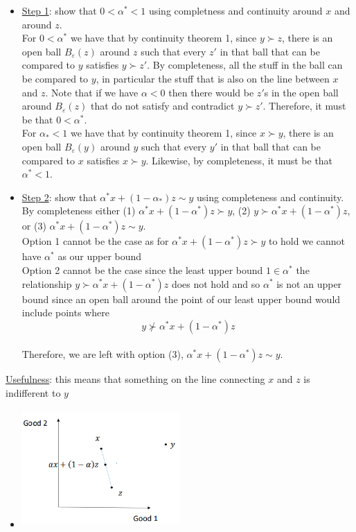 \documentclass{article}
\begin{document}
  \begin{itemize}
    \item  \underline{Step 1}: show that $0 < \alpha^{*} < 1$ using completness and continuity around $x$ and around $z$. \\ For $0 < \alpha^{*}$ we have that by continuity theorem 1, since $y \succ z$, there is an open ball $B_{\varepsilon}(z)$ around $z$ such that every $z'$ in that ball that can be compared to $y$ satisfies $y \succ z'$. By completeness, all the stuff in the ball can be compared to $y$, in particular the stuff that is also on the line between $x$ and $z$. Note that if we have $\alpha < 0$ then there would be $z'$s in the open ball around $B_{\varepsilon}(z)$ that do not satisfy and contradict $y \succ z'$. Therefore, it must be that $0 < \alpha^{*}$. \\ For $\alpha_{*} < 1$ we have that by continuity theorem 1, since $x \succ y$, there is an open ball $B_{\varepsilon}(y)$ around $y$ such that every $y'$ in that ball that can be compared to $x$ satisfies $x \succ y$. Likewise, by completeness, it must be that $\alpha^{*} < 1$.
    \item  \underline{Step 2}: show that $\alpha^{*}x + (1 - \alpha_{*})z \sim y$ using completeness and continuity. By completeness either (1) $\alpha^{*}x + (1-\alpha^{*})z \succ y$, (2) $y \succ \alpha^{*}x + (1-\alpha^{*})z$, or (3) $\alpha^{*}x + (1-\alpha^{*})z \sim y$. \\ Option 1 cannot be the case as for $\alpha^{*}x + (1-\alpha^{*})z \succ y$ to hold we cannot have $\alpha^{*}$ as our upper bound \\ Option 2 cannot be the case since the least upper bound $1 \in \alpha^{*}$ the relationship $y \succ \alpha^{*}x + (1-\alpha^{*})z$ does not hold and so $\alpha^{*}$ is not an upper bound since an open ball around the point of our least upper bound would include points where $$y \nsucc \alpha^{*}x + (1-\alpha^{*})z$$ \\ Therefore, we are left with option (3), $\alpha^{*}x + (1-\alpha^{*})z \sim y$.
  \end{itemize}
  \par
  \underline{Usefulness}: this means that something on the line connecting $x$ and $z$ is indifferent to $y$
  \begin{itemize}
    \item  \includegraphics[width=6cm, height=4.5cm]{pic9}
  \end{itemize}
  \par
\vspace{6mm}
\end{document}
